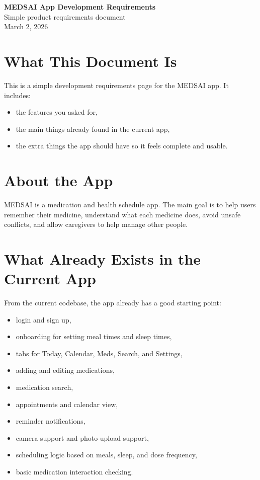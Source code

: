 \documentclass[11pt,a4paper]{article}
\begin{document}
\begin{center}
{\Huge \textbf{MEDSAI App Development Requirements}}\\[0.4cm]
{\large Simple product requirements document}\\[0.2cm]
{\large March 2, 2026}
\end{center}

\vspace{0.5cm}

\tableofcontents
\newpage

\section{What This Document Is}
This is a simple development requirements page for the MEDSAI app. It includes:
\begin{itemize}
    \item the features you asked for,
    \item the main things already found in the current app,
    \item the extra things the app should have so it feels complete and usable.
\end{itemize}

\section{About the App}
MEDSAI is a medication and health schedule app. The main goal is to help users remember their medicine, understand what each medicine does, avoid unsafe conflicts, and allow caregivers to help manage other people.

\section{What Already Exists in the Current App}
From the current codebase, the app already has a good starting point:
\begin{itemize}
    \item login and sign up,
    \item onboarding for setting meal times and sleep times,
    \item tabs for Today, Calendar, Meds, Search, and Settings,
    \item adding and editing medications,
    \item medication search,
    \item appointments and calendar view,
    \item reminder notifications,
    \item camera support and photo upload support,
    \item scheduling logic based on meals, sleep, and dose frequency,
    \item basic medication interaction checking.
\end{itemize}
\end{document}
